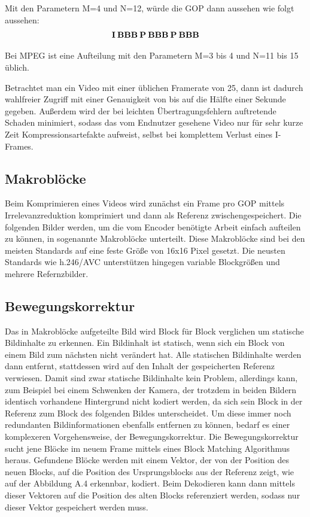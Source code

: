 Mit den Parametern M=4 und N=12, würde die GOP dann aussehen wie folgt aussehen:
\begin{align*}
\bold{I\:BBB\:P\:BBB\:P\:BBB}
\end{align*}

Bei MPEG ist eine Aufteilung mit den Parametern M=3 bis 4 und N=11 bis 15 üblich. \cite{symes_peter_digital_2004}

Betrachtet man ein Video mit einer üblichen Framerate von 25, dann ist dadurch wahlfreier Zugriff mit einer Genauigkeit von bis auf die Hälfte einer Sekunde gegeben. Außerdem wird der bei leichten Übertragungsfehlern auftretende Schaden minimiert, sodass das vom Endnutzer gesehene Video nur für sehr kurze Zeit Kompressionsartefakte aufweist, selbst bei komplettem Verlust eines I-Frames. 
\subsection{Makroblöcke}
Beim Komprimieren eines Videos wird zunächst ein Frame pro GOP mittels Irrelevanzreduktion komprimiert und dann als Referenz zwischengespeichert. Die folgenden Bilder werden, um die vom Encoder benötigte Arbeit einfach aufteilen zu können, in sogenannte Makroblöcke unterteilt. Diese Makroblöcke sind bei den meisten Standards auf eine feste Größe von 16x16 Pixel gesetzt.\cite{symes_peter_digital_2004} Die neusten Standards wie h.246/AVC unterstützen hingegen variable Blockgrößen und mehrere Refernzbilder. \cite{lin2009vlsi}
\subsection{Bewegungskorrektur}
Das in Makroblöcke aufgeteilte Bild wird Block für Block verglichen um statische Bildinhalte zu erkennen. \cite{symes_peter_digital_2004} Ein Bildinhalt ist statisch, wenn sich ein Block von einem Bild zum nächsten nicht verändert hat. Alle statischen Bildinhalte werden dann entfernt, stattdessen wird auf den Inhalt der gespeicherten Referenz verwiesen. 
Damit sind zwar statische Bildinhalte kein Problem, allerdings kann, zum Beispiel bei einem Schwenken der Kamera, der trotzdem in beiden Bildern identisch vorhandene Hintergrund nicht kodiert werden, da sich sein Block in der Referenz zum Block des folgenden Bildes unterscheidet. Um diese immer noch redundanten Bildinformationen ebenfalls entfernen zu können, bedarf es einer komplexeren Vorgehensweise, der Bewegungskorrektur.
Die Bewegungskorrektur sucht jene Blöcke im neuem Frame mittels eines Block Matching Algorithmus heraus. Gefundene Blöcke werden mit einem Vektor, der von der Position des neuen Blocks, auf die Position des Ursprungsblocks aus der Referenz zeigt, wie auf der Abbildung A.4 erkennbar, kodiert.\cite{symes_peter_digital_2004} Beim Dekodieren kann dann mittels dieser Vektoren auf die Position des alten Blocks referenziert werden, sodass nur dieser Vektor gespeichert werden muss.
